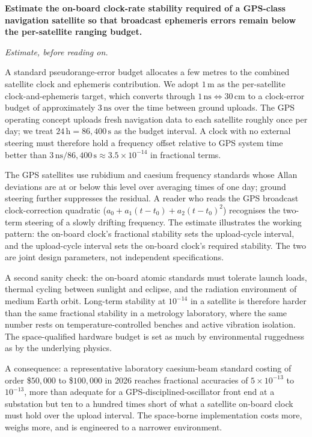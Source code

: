 \begin{estimation}
\textbf{Estimate the on-board clock-rate stability required of a
GPS-class navigation satellite so that broadcast ephemeris errors
remain below the per-satellite ranging budget.}

\smallskip
\textit{Estimate, before reading on.}

\smallskip
A standard pseudorange-error budget allocates a few metres to the
combined satellite clock and ephemeris contribution. We adopt $1
\,\si{\meter}$ as the per-satellite clock-and-ephemeris target,
which converts through $1 \,\si{\nano\second} \Leftrightarrow 30
\,\si{\centi\meter}$ to a clock-error budget of approximately
$3 \,\si{\nano\second}$ over the time between ground uploads. The
GPS operating concept uploads fresh navigation data to each
satellite roughly once per day; we treat $24 \,\si{\hour} = 86{,}
400 \,\si{\second}$ as the budget interval. A clock with no
external steering must therefore hold a frequency offset relative
to GPS system time better than $3 \,\si{\nano\second} / 86{,}400
\,\si{\second} \approx 3.5 \times 10^{-14}$ in fractional terms.

The GPS satellites use rubidium and caesium frequency standards
whose Allan deviations are at or below this level over averaging
times of one day; ground steering further suppresses the residual.
A reader who reads the GPS broadcast clock-correction quadratic
($a_{0} + a_{1}(t - t_{0}) + a_{2}(t - t_{0})^{2}$) recognises the
two-term steering of a slowly drifting frequency. The estimate
illustrates the working pattern: the on-board clock's fractional
stability sets the upload-cycle interval, and the upload-cycle
interval sets the on-board clock's required stability. The two
are joint design parameters, not independent specifications.

A second sanity check: the on-board atomic standards must tolerate
launch loads, thermal cycling between sunlight and eclipse, and
the radiation environment of medium Earth orbit.
Long-term stability at $10^{-14}$ in a satellite is therefore
harder than the same fractional stability in a metrology
laboratory, where the same number rests on temperature-controlled
benches and active vibration isolation. The space-qualified
hardware budget is set as much by environmental ruggedness as by
the underlying physics.

A consequence: a representative laboratory caesium-beam standard
costing of order \$$50{,}000$ to \$$100{,}000$ in 2026 reaches
fractional accuracies of $5 \times 10^{-13}$ to $10^{-13}$, more
than adequate for a GPS-disciplined-oscillator front end at a
substation but ten to a hundred times short of what a satellite
on-board clock must hold over the upload interval. The space-borne
implementation costs more, weighs more, and is engineered to a
narrower environment.
\end{estimation}

